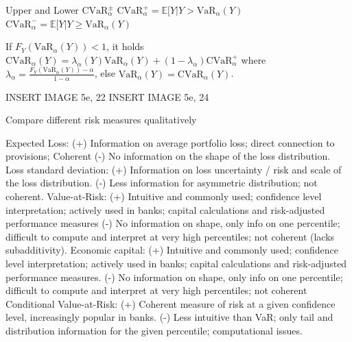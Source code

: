 Upper and Lower \( \text{CVaR}_{\alpha}^\pm \)
\( \text{CVaR}_{\alpha}^{+} = \mathbb{E}[Y|Y > \text{VaR}_{\alpha}(Y) \)
\( \text{CVaR}_{\alpha}^{-} = \mathbb{E}[Y|Y \geq \text{VaR}_{\alpha}(Y) \)

If \( F_Y(\text{VaR}_\alpha(Y)) < 1 \), it holds 
\( \text{CVaR}_{\alpha}(Y) = \lambda_\alpha(Y)\text{VaR}_\alpha(Y) + (1 - \lambda_\alpha)\text{CVaR}_{\alpha}^{+}\)
where \( \lambda_\alpha = \frac{F_Y(\text{VaR}_\alpha(Y)) - \alpha}{1 - \alpha} \),
else \( \text{VaR}_\alpha(Y) = \text{CVaR}_{\alpha}(Y) \).

INSERT IMAGE 5e, 22 
INSERT IMAGE 5e, 24

Compare different risk measures qualitatively

Expected Loss:
(+) Information on average portfolio loss; direct connection to provisions; Coherent
(-) No information on the shape of the loss distribution.
Loss standard deviation:
(+) Information on loss uncertainty / risk and scale of the loss distribution.
(-) Less information for asymmetric distribution; not coherent.
Value-at-Risk:
(+) Intuitive and commonly used; confidence level interpretation; actively used in
banks; capital calculations and risk-adjusted performance measures
(-) No information on shape, only info on one percentile; difficult to compute and
interpret at very high percentiles; not coherent (lacks subadditivity).
Economic capital:
(+) Intuitive and commonly used; confidence level interpretation; actively
used in banks; capital calculations and risk-adjusted performance measures.
(-) No information on shape, only info on one percentile; difficult to compute
and interpret at very high percentiles; not coherent
Conditional Value-at-Risk:
(+) Coherent measure of risk at a given confidence level, increasingly
popular in banks.
(-) Less intuitive than VaR; only tail and distribution information for the
given percentile; computational issues.
